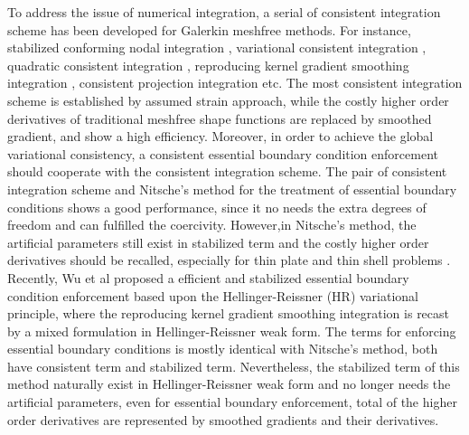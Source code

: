 To address the issue of numerical integration, a serial of consistent integration scheme has been developed for Galerkin meshfree methods. For instance, stabilized conforming nodal integration \cite{chen2001}, variational consistent integration \cite{chen2013}, quadratic consistent integration \cite{duan2012}, reproducing kernel gradient smoothing integration \cite{wang2019d}, consistent projection integration \cite{wang2023} etc.
The most consistent integration scheme is established by assumed strain approach, while the costly higher order derivatives of traditional meshfree shape functions are replaced by smoothed gradient, and show a high efficiency. 
Moreover, in order to achieve the global variational consistency, a consistent essential boundary condition enforcement should cooperate with the consistent integration scheme. 
The pair of consistent integration scheme and Nitsche's method for the treatment of essential boundary conditions shows a good performance, since it no needs the extra degrees of freedom and can fulfilled the coercivity. However,in Nitsche's method, the artificial parameters still exist in stabilized term and the costly higher order derivatives should be recalled, especially for thin plate and thin shell problems \cite{benzaken2021}.
Recently, Wu et al \cite{wu2022b, wu2023} proposed a efficient and stabilized essential boundary condition enforcement based upon the Hellinger-Reissner (HR) variational principle, where the reproducing kernel gradient smoothing integration is recast by a mixed formulation in Hellinger-Reissner weak form. The terms for enforcing essential boundary conditions is mostly identical with Nitsche's method, both have consistent term and stabilized term. Nevertheless, the stabilized term of this method naturally exist in Hellinger-Reissner weak form and no longer needs the artificial parameters, even for essential boundary enforcement, total of the higher order derivatives are represented by smoothed gradients and their derivatives.

